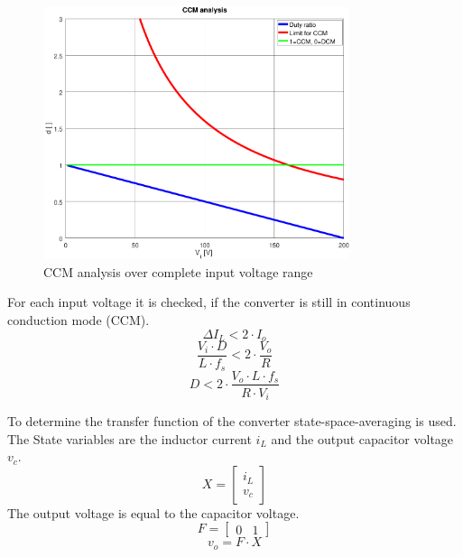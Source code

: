 \documentclass[a4paper,11pt,fleqn]{article}
\begin{document}
\begin{figure}[h!]
    \centering
    \includegraphics[width=0.8\textwidth]{fig/ccm.pdf}
    \caption{CCM analysis over complete input voltage range}
    \label{fig_ccm}
\end{figure}

For each input voltage it is checked, if the converter is still in continuous 
conduction mode (CCM). 
\[ \Delta I_L < 2 \cdot I_o \]
\[ \dfrac{V_i \cdot D}{L \cdot f_s} < 2 \cdot \dfrac{V_o}{R} \]
\[ D < 2 \cdot \dfrac{V_o \cdot L \cdot f_s}{R \cdot V_i} \]

To determine the transfer function of the converter state-space-averaging is used. The State variables are the inductor current $i_L$ and the output capacitor voltage $v_c$. 
\[ X = \begin{bmatrix}i_L\\v_c\end{bmatrix} \]
The output voltage is equal to the capacitor voltage. 
\[ F = \begin{bmatrix}0 & 1\end{bmatrix} \]
\[ v_o = F \cdot X \]
\end{document}
